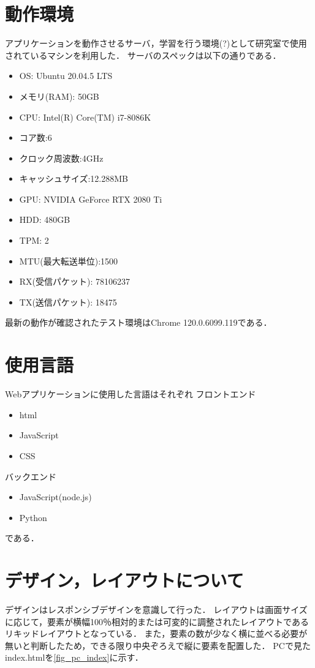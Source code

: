 \section{動作環境}
アプリケーションを動作させるサーバ，学習を行う環境(?)として研究室で使用されているマシンを利用した．
サーバのスペックは以下の通りである．
\begin{itemize} 
	\item OS: Ubuntu 20.04.5 LTS 
	\item メモリ(RAM): 50GB 
	\item CPU: Intel(R) Core(TM) i7-8086K 
	\item コア数:6
	\item クロック周波数:4GHz
	\item キャッシュサイズ:12.288MB
	\item GPU: NVIDIA GeForce RTX 2080 Ti 
	\item HDD: 480GB 
	\item TPM: 2
	\item MTU(最大転送単位):1500
	\item RX(受信パケット): 78106237
	\item TX(送信パケット): 18475
\end{itemize}

最新の動作が確認されたテスト環境はChrome 120.0.6099.119である．



\section{使用言語}
Webアプリケーションに使用した言語はそれぞれ
フロントエンド
\begin{itemize}
	\item html
	\item JavaScript
	\item CSS
\end{itemize}
バックエンド
\begin{itemize}
	\item JavaScript(node.js)
	\item Python
\end{itemize}
である．

\section{デザイン，レイアウトについて}
デザインはレスポンシブデザインを意識して行った．
レイアウトは画面サイズに応じて，要素が横幅100％相対的または可変的に調整されたレイアウトであるリキッドレイアウトとなっている．
また，要素の数が少なく横に並べる必要が無いと判断したため，できる限り中央ぞろえで縦に要素を配置した．
PCで見たindex.htmlを\ref{fig_pc_index}に示す．
